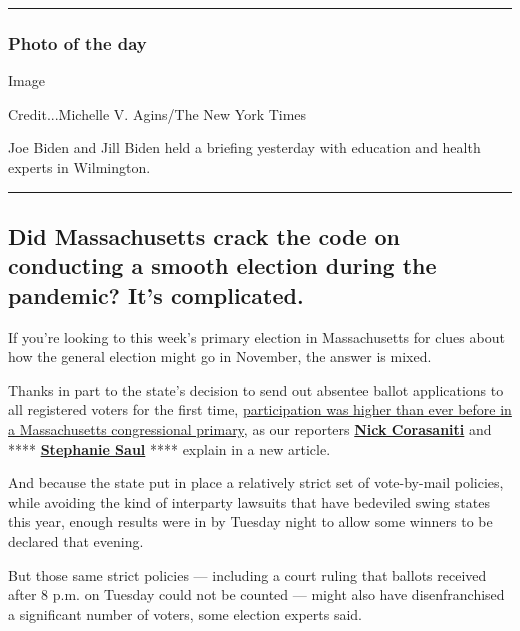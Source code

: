 \begin{center}\rule{0.5\linewidth}{\linethickness}\end{center}

\hypertarget{photo-of-the-day}{%
\subsubsection{Photo of the day}\label{photo-of-the-day}}

Image

Credit...Michelle V. Agins/The New York Times

Joe Biden and Jill Biden held a briefing yesterday with education and
health experts in Wilmington.

\begin{center}\rule{0.5\linewidth}{\linethickness}\end{center}

\hypertarget{did-massachusetts-crack-the-code-on-conducting-a-smooth-election-during-the-pandemic-its-complicated}{%
\subsection{Did Massachusetts crack the code on conducting a smooth
election during the pandemic? It's
complicated.}\label{did-massachusetts-crack-the-code-on-conducting-a-smooth-election-during-the-pandemic-its-complicated}}

If you're looking to this week's primary election in Massachusetts for
clues about how the general election might go in November, the answer is
mixed.

Thanks in part to the state's decision to send out absentee ballot
applications to all registered voters for the first time,
\href{https://www.nytimes3xbfgragh.onion/2020/09/02/us/politics/massachusetts-election-voting.html}{participation
was higher than ever before in a Massachusetts congressional primary},
as our reporters
\textbf{\href{https://www.nytimes3xbfgragh.onion/by/nick-corasaniti}{Nick
Corasaniti}} and ****
\textbf{\href{https://www.nytimes3xbfgragh.onion/by/stephanie-saul}{Stephanie
Saul}} **** explain in a new article.

And because the state put in place a relatively strict set of
vote-by-mail policies, while avoiding the kind of interparty lawsuits
that have bedeviled swing states this year, enough results were in by
Tuesday night to allow some winners to be declared that evening.

But those same strict policies --- including a court ruling that ballots
received after 8 p.m. on Tuesday could not be counted --- might also
have disenfranchised a significant number of voters, some election
experts said.

